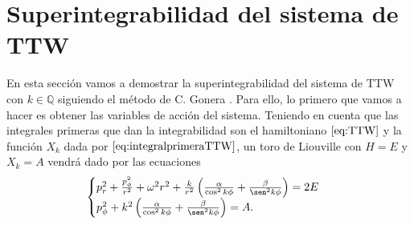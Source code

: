 \documentclass[11pt,a4paper,twoside]{article}
\theoremstyle{definition} \newtheorem{defn}[thm]{Definición}
\theoremstyle{definition} \newtheorem{ejemplo}[thm]{Ejemplo}
\theoremstyle{definition} \newtheorem{ejercicio}[thm]{Ejercicio}
\theoremstyle{remark} \newtheorem*{obs}{Observación}
\def\QQ{\mathbb{Q}}
\begin{document}
\section{Superintegrabilidad del sistema de TTW}\label{superintTTW}
En esta sección vamos a demostrar la superintegrabilidad del sistema de TTW con $k\in \QQ$ siguiendo el método de C. Gonera \cite{gonera}. Para ello, lo primero que vamos a hacer es obtener las variables de acción del sistema. Teniendo en cuenta que las integrales primeras que dan la integrabilidad son el hamiltoniano $\eqref{eq:TTW}$ y la función $X_k$ dada por $\eqref{eq:integralprimeraTTW}$, un toro de Liouville con $H=E$ y $X_k=A$ vendrá dado por las ecuaciones
\begin{equation}
  \begin{cases}
    p_r^2+\frac{p_{\phi}^2}{r^2}+\omega^2r^2 + \frac{k}{r^2}\left( \frac{\alpha}{\cos^2k\phi} +\frac{\beta}{\sen^2k\phi}\right) = 2E \\
    p_{\phi}^2+k^2\left( \frac{\alpha}{\cos^2k\phi} +\frac{\beta}{\sen^2k\phi}\right)=A.
  \end{cases}
\end{equation}
\end{document}
